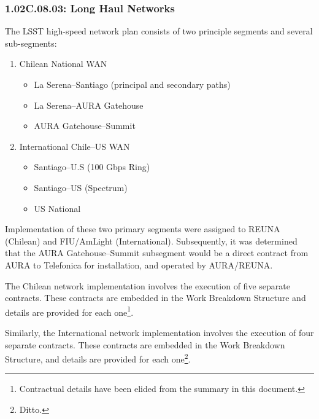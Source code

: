 \subsubsection*{1.02C.08.03: Long Haul Networks}

The LSST high-speed network plan consists of two principle segments and
several sub-segments:

\begin{enumerate}
  \item{Chilean National WAN

    \begin{itemize}
      \item{La Serena--Santiago (principal and secondary paths)}
      \item{La Serena--AURA Gatehouse}
      \item{AURA Gatehouse--Summit}
    \end{itemize}
  }

  \item{International Chile--US WAN

    \begin{itemize}
      \item{Santiago--U.S (100 Gbps Ring)}
      \item{Santiago--US (Spectrum)}
      \item{US National}
    \end{itemize}
  }
\end{enumerate}

Implementation of these two primary segments were assigned to REUNA (Chilean)
and FIU/AmLight (International). Subsequently, it was determined that the AURA
Gatehouse--Summit subsegment would be a direct contract from AURA to
Telefonica for installation, and operated by AURA/REUNA.

The Chilean network implementation involves the execution of five separate
contracts. These contracts are embedded in the Work Breakdown Structure and
details are provided for each one\footnote{Contractual details have been
elided from the summary in this document.}.

Similarly, the International network implementation involves the execution of
four separate contracts. These contracts are embedded in the Work Breakdown
Structure, and details are provided for each one\footnote{Ditto.}.
